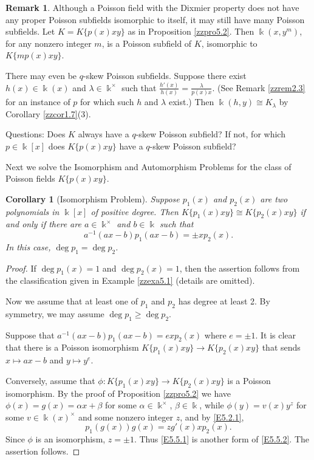 \documentclass[12pt]{amsart}
\theoremstyle{plain}
\newtheorem{corollary}[theorem]{Corollary}
\numberwithin{theorem}{section}
\numberwithin{equation}{theorem}
\theoremstyle{definition}
\newtheorem{remark}[theorem]{Remark}
\newcommand \kx {\Bbbk^\times}
\begin{document}
\begin{remark}
\label{zzrem5.4}
Although a Poisson field with the Dixmier property does not have any proper Poisson subfields isomorphic to itself, it may 
still have many Poisson subfields. Let $K = K\{p(x)xy\}$ as 
in Proposition \ref{zzpro5.2}. Then $\Bbbk(x,y^m)$, for any 
nonzero integer $m$, is a Poisson subfield of $K$, isomorphic 
to $K\{mp(x)xy\}$.

There may even be $q$-skew Poisson subfields. Suppose there 
exist $h(x)  \in \Bbbk(x)$ and $\lambda \in \kx$ such that 
$\frac{h'(x)}{h(x)} = \frac\lambda{p(x)x}$. 
(See Remark \ref{zzrem2.3} for an instance of $p$ for 
which such $h$ and $\lambda$ exist.) Then 
$\Bbbk(h,y) \cong K_\lambda$ by Corollary \ref{zzcor1.7}(3).

Questions: Does $K$ always have a $q$-skew Poisson subfield? 
If not, for which $p \in \Bbbk[x]$ does $K\{p(x)xy\}$ have a 
$q$-skew Poisson subfield?
\end{remark}


Next we solve the Isomorphism and Automorphism Problems for the 
class of Poisson fields $K\{p(x)xy\}$. 

\begin{corollary}[Isomorphism Problem]
\label{zzcor5.5} Suppose $p_1(x)$ and $p_2(x)$ are two 
polynomials in $\Bbbk[x]$ of positive degree. Then $K\{p_1(x)xy\}
\cong K\{p_2(x)xy\}$ if and only if there are 
$a\in \Bbbk^{\times}$
and $b\in \Bbbk$ such that 
\begin{equation}
\label{E5.5.1}\tag{E5.5.1}
a^{-1}(ax-b)p_1(ax-b)=\pm xp_2(x).
\end{equation}
In this case, $\deg p_1=\deg p_2$. 
\end{corollary}

\begin{proof} If $\deg p_1(x) = 1$ and $\deg p_2(x) = 1$, 
then the assertion follows from the classification given in 
Example \ref{zzexa5.1} (details are omitted). 

Now we assume that at least one of $p_1$ and $p_2$ has degree 
at least 2. By symmetry, we may assume $\deg p_1\geq \deg p_2$.

Suppose that $a^{-1}(ax-b)p_1(ax-b)=e xp_2(x)$ where $e=\pm 1$. It 
is clear that there is a Poisson 
isomorphism $K\{p_1(x)xy\}\to K\{p_2(x)xy\}$ that sends $x \mapsto ax-b$ and $y \mapsto y^{e}$.

Conversely, assume that $\phi: K\{p_1(x)xy\}\to K\{p_2(x)xy\}$
is a Poisson isomorphism.  By the proof
of Proposition \ref{zzpro5.2} we have $\phi(x) = g(x) = \alpha x + \beta$ for some $\alpha \in \kx$, $\beta \in \Bbbk$, while $\phi(y)=v(x) y^z$ for 
some $v \in \Bbbk(x)^\times$ and some nonzero integer $z$, and by \eqref{E5.2.1},
\begin{equation}
\label{E5.5.2}\tag{E5.5.2}
p_1(g(x)) g(x) =z g'(x) x p_2(x).
\end{equation}
Since $\phi$ is an isomorphism, $z=\pm 1$. Thus \eqref{E5.5.1} is 
another form of \eqref{E5.5.2}. The assertion follows.
\end{proof}
\end{document}
